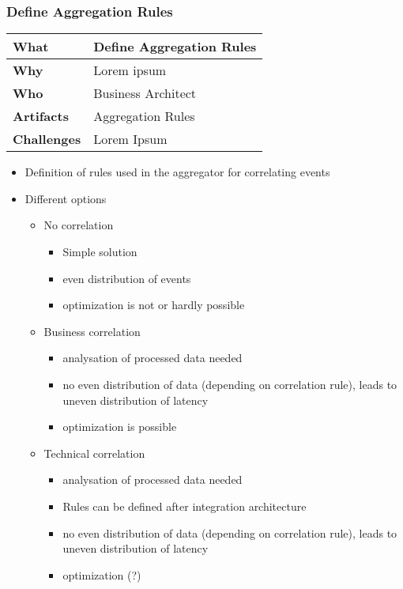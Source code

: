 \subsubsection{Define Aggregation Rules}
\begin{minipage}{\textwidth}
 \label{table:ch6_Task_Define_Aggregation_Rules}
\begin{tabular}
	{|m{3cm}|m{10cm}|} \hline \bfseries What & Define Aggregation Rules\\
	\hline \bfseries Why & Lorem ipsum\\
	\hline \bfseries Who & Business Architect\\
	\hline \bfseries Artifacts & Aggregation Rules\\
	\hline \bfseries Challenges & Lorem Ipsum\\
	\hline 
\end{tabular}
\end{minipage}

\begin{itemize}
	\item Definition of rules used in the aggregator for correlating events
	\item Different options
	\begin{itemize}
		\item No correlation
		\begin{itemize}
			\item Simple solution
			\item even distribution of events
			\item optimization is not or hardly possible
		\end{itemize}
		\item Business correlation
		\begin{itemize}
			\item analysation of processed data needed
			\item no even distribution of data (depending on correlation rule), leads to uneven distribution of latency
			\item optimization is possible
		\end{itemize}
		\item Technical correlation
		\begin{itemize}
			\item analysation of processed data needed
			\item Rules can be defined after integration architecture
			\item no even distribution of data (depending on correlation rule), leads to uneven distribution of latency
			\item optimization (?)
		\end{itemize}
	\end{itemize}
\end{itemize}

